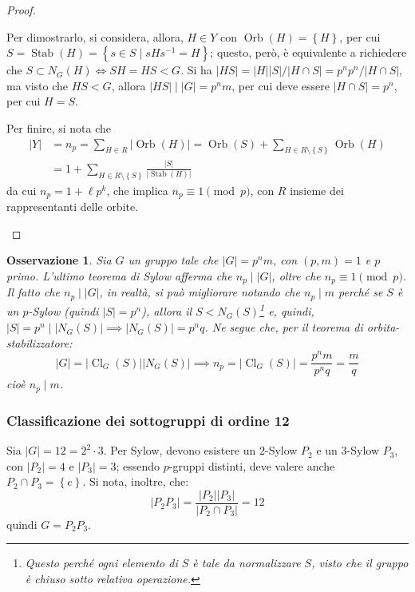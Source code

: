 \documentclass[11pt]{article}
\theoremstyle{style}
\newtheorem{osservazione}{Osservazione}[section]
\numberwithin{equation}{subsection}
\begin{document}
\begin{proof}
\begin{enumerate}[(a).]
				Per dimostrarlo, si considera, allora, $H \in Y$ con $\operatorname{Orb} (H) = \left\{ H \right\} $, per cui $S = \operatorname{Stab}(H) = \left\{ s \in S  \mid s H s^{-1} = H\right\}  $; questo, per\`o, \`e equivalente a richiedere che $S \subset  N_G(H) \iff SH = HS < G$.
				Si ha $\lvert HS \rvert = \lvert H \rvert \lvert S \rvert  / \lvert H \cap S \rvert = p^np^n / \lvert H\cap S \rvert $, ma visto che $HS < G$, allora $\lvert HS \rvert  \mid |G| = p^nm$, per cui deve essere $\lvert H\cap S \rvert =p^n$, per cui $H = S$.

				Per finire, si nota che
				\[
					\begin{split}
						\lvert Y \rvert &=n_p = \sum_{H \in R}^{} \lvert \operatorname{Orb} (H) \rvert = \operatorname{Orb} (S) + \sum_{H \in R \setminus\left\{ S \right\} }^{} \operatorname{Orb} (H) \\
								&= 1 + \sum_{H \in R \setminus\left\{ S \right\} }^{} \frac{\lvert S \rvert }{\lvert \operatorname{Stab} (H) \rvert }
					\end{split}
				\] 
				da cui $n_p = 1 + \ell p^k$, che implica $n_p \equiv 1 \pmod{p} $, con $R$ insieme dei rappresentanti delle orbite.
		\end{enumerate}
	\end{proof}
\begin{osservazione}
Sia $G$ un gruppo tale che $\lvert G \rvert =p^n m $, con $(p,m)= 1$ e $p$ primo. L'ultimo teorema di Sylow afferma che $n_p  \mid \lvert G \rvert$, oltre che $n_p \equiv 1 \pmod{p} $.
Il fatto che $n_p  \mid |G|$, in realt\`a, si pu\`o migliorare notando che $n_p  \mid  m$ perch\'e se $S$ \`e un $p$-Sylow (quindi $\lvert S \rvert =p^n$), allora il $S < N_G(S)$\footnote{Questo perch\'e ogni elemento di $S$ \`e tale da normalizzare $S$, visto che il gruppo \`e chiuso sotto relativa operazione.} e, quindi, $\lvert S \rvert = p^n  \mid \lvert N_G(S) \rvert \implies \lvert N_G(S) \rvert = p^n q$.
Ne segue che, per il teorema di orbita-stabilizzatore:
\[
\lvert G \rvert  = \lvert \operatorname{Cl} _G(S)  \rvert \lvert N_G(S) \rvert \implies n_p = \lvert \operatorname{Cl} _G(S) \rvert = \frac{p^n m}{p^n q} = \frac{m}{q}
\] 
cio\`e $n_p  \mid m$.
\end{osservazione}
\subsubsection{Classificazione dei sottogruppi di ordine 12}
	Sia $\lvert G \rvert = 12 = 2^2 \cdot 3$. 
	Per Sylow, devono esistere un $2$-Sylow $P_2$ e un $3$-Sylow $P_3$, con $\lvert P_2 \rvert =4$ e $\lvert P_3 \rvert =3$; essendo $p$-gruppi distinti, deve valere anche $P_2\cap P_3 = \left\{ e \right\} $.
	Si nota, inoltre, che:
	\[
	\lvert P_2P_3 \rvert = \frac{\lvert P_2 \rvert \lvert P_3 \rvert }{\lvert P_2 \cap P_3\rvert} = 12
	\] 
	quindi $G = P_2P_3$.
	
\end{document}
